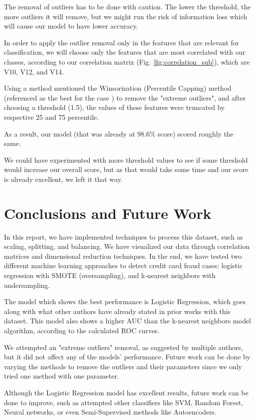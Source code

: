 \documentclass[conference]{IEEEtran}
\begin{document}
The removal of outliers has to be done with caution. The lower the threshold, the more outliers it will remove, but we might run the risk of information loss which will cause our model to have lower accuracy.

In order to apply the outlier removal only in the features that are relevant for classification, we will choose only the features that are most correlated with our classes, according to our correlation matrix (Fig. \ref{fig:correlation_sub}), which are V10, V12, and V14.

Using a method mentioned the Winsorization (Percentile Capping) method (referenced as the best for the case \cite{paper_outlier_silent_killer}) to remove the "extreme outliers", and after choosing a threshold (1.5), the values of these features were truncated by respective 25 and 75 percentile.

As a result, our model (that was already at 98.6\% score) scored roughly the same.

We could have experimented with more threshold values to see if some threshold would increase our overall score, but as that would take some time and our score is already excellent, we left it that way.

\section{Conclusions and Future Work}

In this report, we have implemented techniques to process this dataset, such as scaling, splitting, and balancing. We have visualized our data through correlation matrices and dimensional reduction techniques. In the end, we have tested two different machine learning approaches to detect credit card fraud cases: logistic regression with SMOTE (oversampling), and k-nearest neighbors with undersampling.

The model which shows the best performance is Logistic Regression, which goes along with what other authors have already stated in prior works with this dataset. This model also shows a higher AUC than the k-nearest neighbors model algorithm, according to the calculated ROC curves.

We attempted an "extreme outliers" removal, as suggested by multiple authors, but it did not affect any of the models' performance. Future work can be done by varying the methods to remove the outliers and their parameters since we only tried one method with one parameter.

Although the Logistic Regression model has excellent results, future work can be done to improve, such as attempted other classifiers like SVM, Random Forest, Neural networks, or even Semi-Supervised methods like Autoencoders.
\end{document}
